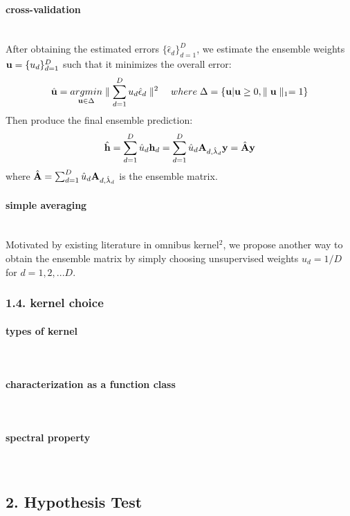 \documentclass[11pt]{article}
\begin{document}
\paragraph{cross-validation}\mbox{}\\
After obtaining the estimated errors $\{\hat{\epsilon}_d\}_{d=1}^D$, we estimate the ensemble weights ${\bf u}=\{u_d\}_{d=1}^D$ such that it minimizes the overall error:
\begin{align*}
\hat{{\bf u}}=\underset{{\bf u} \in \Delta}{argmin}\parallel \sum_{d=1}^Du_d\hat{\epsilon}_d\parallel^2 \quad where\; \Delta=\{{\bf u} | {\bf u} \geq 0, \parallel {\bf u} \parallel_1=1\}
\end{align*}
Then produce the final ensemble prediction:
\begin{align*}
\hat{{\bf h}}=\sum_{d=1}^D \hat{u}_d {\bf h}_d=\sum_{d=1}^D \hat{u}_d {\bf A}_{d,\hat{\lambda}_d}{\bf y}=\hat{{\bf A}}{\bf y}
\end{align*}
where $\hat{{\bf A}}=\sum_{d=1}^D \hat{u}_d {\bf A}_{d,\hat{\lambda}_d}$ is the ensemble matrix.

\paragraph{simple averaging}\mbox{}\\
Motivated by existing literature in omnibus kernel$^{2}$, we propose another way to obtain the ensemble matrix by simply choosing unsupervised weights $u_d=1/D$ for $d=1,2,...D$.

\subsubsection*{{1.4. kernel choice}}
\paragraph{types of kernel}\mbox{}\\
\paragraph{characterization as a function class}\mbox{}\\
\paragraph{spectral property}\mbox{}\\
\subsection*{{2. Hypothesis Test}}
\setcounter{equation}{0}
\renewcommand{\theequation}{2.2.\arabic{equation}}
\end{document}

